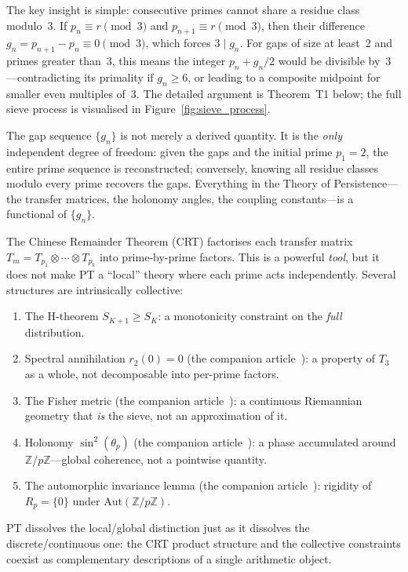 \documentclass[12pt,a4paper]{article}
\begin{document}
The key insight is simple: consecutive primes cannot share a residue
class modulo~3. If $p_n \equiv r \pmod{3}$ and $p_{n+1} \equiv r
\pmod{3}$, then their difference $g_n = p_{n+1} - p_n \equiv 0
\pmod{3}$, which forces $3 \mid g_n$. For gaps of size at least~2
and primes greater than~3, this means the integer $p_n + g_n/2$
would be divisible by~3---contradicting its primality if $g_n \geq 6$,
or leading to a composite midpoint for smaller even multiples of~3.
The detailed argument is Theorem~T1 below; the full sieve
process is visualised in Figure~\ref{fig:sieve_process}.

The gap sequence $\{g_n\}$ is not merely a derived quantity. It is
the \emph{only} independent degree of freedom: given the gaps and the
initial prime $p_1 = 2$, the entire prime sequence is reconstructed;
conversely, knowing all residue classes modulo every prime recovers
the gaps. Everything in the Theory of Persistence---the transfer matrices,
the holonomy angles, the coupling constants---is a functional of
$\{g_n\}$.

\begin{remark}
\label{rem:ch1_not_local}
The Chinese Remainder Theorem (CRT) factorises each transfer matrix
$T_m = T_{p_1} \otimes \cdots \otimes T_{p_k}$ into prime-by-prime
factors. This is a powerful \emph{tool}, but it does not make PT a
``local'' theory where each prime acts independently.  Several
structures are intrinsically collective:
\begin{enumerate}[nosep]
\item The H-theorem $S_{K+1} \geq S_K$: a monotonicity constraint
  on the \emph{full} distribution.
\item Spectral annihilation $r_2(0) = 0$ (the companion article~\cite{companion_M3}): a property of
  $T_3$ as a whole, not decomposable into per-prime factors.
\item The Fisher metric (the companion article~\cite{companion_M2}): a continuous Riemannian geometry
  that \emph{is} the sieve, not an approximation of it.
\item Holonomy $\sin^2(\theta_p)$ (the companion article~\cite{companion_M2}): a phase accumulated
  around $\mathbb{Z}/p\mathbb{Z}$---global coherence, not a
  pointwise quantity.
\item The automorphic invariance lemma (the companion article~\cite{companion_M3}): rigidity of
  $R_p = \{0\}$ under $\mathrm{Aut}(\mathbb{Z}/p\mathbb{Z})$.
\end{enumerate}
PT dissolves the local/global distinction just as it dissolves the
discrete/continuous one: the CRT product structure and the
collective constraints coexist as complementary descriptions of a
single arithmetic object.
\end{remark}
\end{document}
